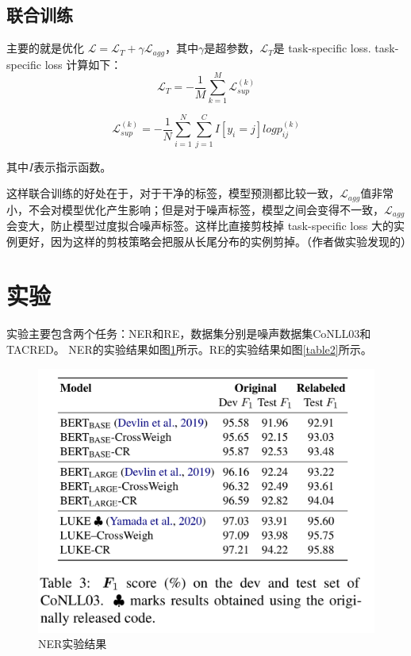 \documentclass{article}
\begin{document}
\subsection{联合训练}
主要的就是优化 $\mathcal{L}=\mathcal{L}_T+\gamma \mathcal{L}_{agg}$，其中$\gamma$是超参数，$\mathcal{L}_T$是 task-specific loss.
task-specific loss 计算如下：
\begin{equation}
    \mathcal{L}_{T} = -\frac{1}{M}\sum_{k=1}^{M}{ \mathcal{L}_{sup}^{(k)} }
    \label{eq5}
\end{equation}

\begin{equation}
    \mathcal{L}_{sup}^{(k)} = -\frac{1}{N}\sum_{i=1}^{N}{\sum_{j=1}^{C}{I[y_i=j]log{p_{ij}^{(k)}}}}
    \label{eq6}
\end{equation}

其中$I$表示指示函数。

这样联合训练的好处在于，对于干净的标签，模型预测都比较一致，$\mathcal{L}_{agg}$值非常小，不会对模型优化产生影响；但是对于噪声标签，模型之间会变得不一致，$\mathcal{L}_{agg}$会变大，防止模型过度拟合噪声标签。这样比直接剪枝掉 task-specific loss 大的实例更好，因为这样的剪枝策略会把服从长尾分布的实例剪掉。（作者做实验发现的）



\section{实验}

实验主要包含两个任务：NER和RE，数据集分别是噪声数据集CoNLL03和TACRED。
NER的实验结果如图\ref{table1}所示。RE的实验结果如图\ref{table2}所示。
\begin{figure}[H]
    \centering
    \includegraphics[width=.8\textwidth]{fig/main result ner.png}
    \caption{NER实验结果}
    \label{table1}
\end{figure}
\end{document}
